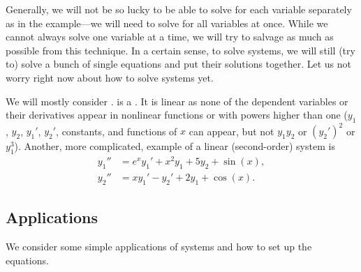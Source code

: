 Generally, we will not be so lucky to be able to solve for
each variable separately as in the 
example---we will need to solve for all variables at once.
While we cannot always solve one variable at a time,
we will try to salvage as much as possible from this technique.
In a certain sense, to solve systems, we will still (try to) solve
a bunch of single equations and put their solutions together.
Let us not worry right now about how to solve systems yet.

We will mostly consider \emph{}.
is a \emph{}.
It is linear as none of the dependent variables or their derivatives
appear in nonlinear functions or with powers
higher than one ($y_1$, $y_2$, $y_1'$, $y_2'$, constants, and functions of $x$
can appear, but not $y_1y_2$ or ${(y_2')}^2$ or $y_1^3$).
Another, more
complicated, example of a linear (second-order) system is
\begin{equation*}
\begin{aligned}
y_1'' &= e^x y_1' + x^2 y_1 + 5 y_2 + \sin(x), \\
y_2'' &= x y_1'-y_2' + 2 y_1 + \cos(x).
\end{aligned}
\end{equation*}

\subsection{Applications}

We consider some simple applications of systems and how to set up the
equations.

